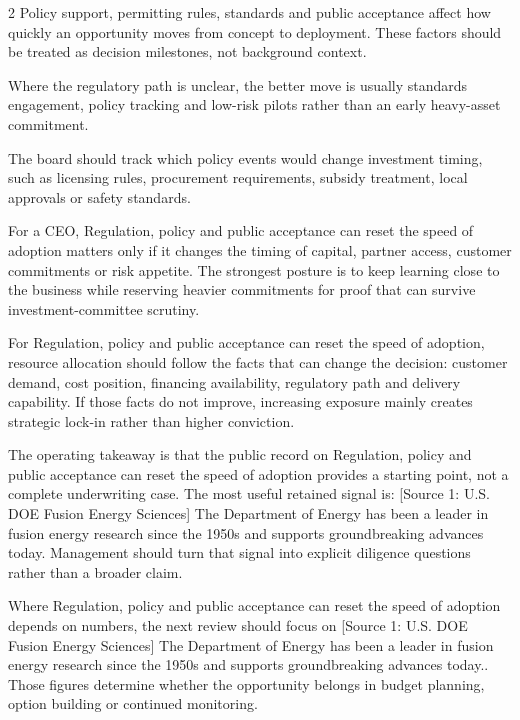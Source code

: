 \documentclass[10pt,a4paper]{article}
\begin{document}
\begin{multicols}{2}
{\small Policy support, permitting rules, standards and public acceptance affect how quickly an opportunity moves from concept to deployment. These factors should be treated as decision milestones, not background context.}\par
{\small Where the regulatory path is unclear, the better move is usually standards engagement, policy tracking and low-risk pilots rather than an early heavy-asset commitment.}\par
{\small The board should track which policy events would change investment timing, such as licensing rules, procurement requirements, subsidy treatment, local approvals or safety standards.}\par
{\small For a CEO, Regulation, policy and public acceptance can reset the speed of adoption matters only if it changes the timing of capital, partner access, customer commitments or risk appetite. The strongest posture is to keep learning close to the business while reserving heavier commitments for proof that can survive investment-committee scrutiny.}\par
{\small For Regulation, policy and public acceptance can reset the speed of adoption, resource allocation should follow the facts that can change the decision: customer demand, cost position, financing availability, regulatory path and delivery capability. If those facts do not improve, increasing exposure mainly creates strategic lock-in rather than higher conviction.}\par
{\small The operating takeaway is that the public record on Regulation, policy and public acceptance can reset the speed of adoption provides a starting point, not a complete underwriting case. The most useful retained signal is: [Source 1: U.S. DOE Fusion Energy Sciences] The Department of Energy has been a leader in fusion energy research since the 1950s and supports groundbreaking advances today. Management should turn that signal into explicit diligence questions rather than a broader claim.}\par
{\small Where Regulation, policy and public acceptance can reset the speed of adoption depends on numbers, the next review should focus on [Source 1: U.S. DOE Fusion Energy Sciences] The Department of Energy has been a leader in fusion energy research since the 1950s and supports groundbreaking advances today.. Those figures determine whether the opportunity belongs in budget planning, option building or continued monitoring.}\par
\end{multicols}
\label{chap:7:end}
\end{document}
